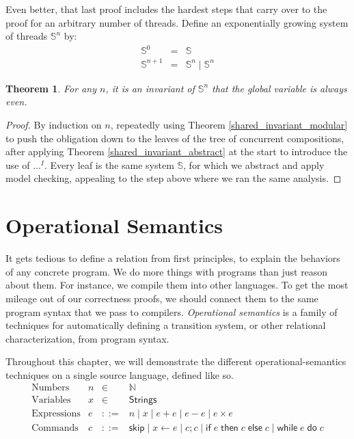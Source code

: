 \documentclass{amsbook}
\newtheorem{theorem}{Theorem}[chapter]
\theoremstyle{definition}
\theoremstyle{remark}
\numberwithin{section}{chapter}
\numberwithin{equation}{chapter}
\begin{document}
Even better, that last proof includes the hardest steps that carry over to the proof for an arbitrary number of threads.
Define an exponentially growing system of threads ${\mathbb S}^n$ by:
\begin{eqnarray*}
  {\mathbb S}^0 &=& \mathbb S \\
  {\mathbb S}^{n+1} &=& {\mathbb S}^n \mid {\mathbb S}^n
\end{eqnarray*}

\begin{theorem}
  For any $n$, it is an invariant of ${\mathbb S}^n$ that the global variable is always even.
\end{theorem}

\begin{proof}
  By induction on $n$, repeatedly using Theorem \ref{shared_invariant_modular} to push the obligation down to the leaves of the tree of concurrent compositions, after applying Theorem \ref{shared_invariant_abstract} at the start to introduce the use of $\ldots^I$.
  Every leaf is the same system $\mathbb S$, for which we abstract and apply model checking, appealing to the step above where we ran the same analysis.
\end{proof}



\chapter{\label{operational_semantics}Operational Semantics}

It gets tedious to define a relation from first principles, to explain the behaviors of any concrete program.
We do more things with programs than just reason about them.
For instance, we compile them into other languages.
To get the most mileage out of our correctness proofs, we should connect them to the same program syntax that we pass to compilers.
\emph{Operational semantics} is a family of techniques for automatically defining a transition system, or other relational characterization, from program syntax.

\newcommand{\assign}[2]{#1 \leftarrow #2}
\newcommand{\skipe}[0]{\mathsf{skip}}
\newcommand{\ifte}[3]{\mathsf{if} \; #1 \; \mathsf{then} \; #2 \; \mathsf{else} \; #3}
\newcommand{\while}[2]{\mathsf{while} \; #1 \; \mathsf{do} \; #2}

Throughout this chapter, we will demonstrate the different operational-semantics techniques on a single source language, defined like so.
$$\begin{array}{rrcl}
  \textrm{Numbers} & n &\in& \mathbb N \\
  \textrm{Variables} & x &\in& \mathsf{Strings} \\
  \textrm{Expressions} & e &::=& n \mid x \mid e + e \mid e - e \mid e \times e \\
  \textrm{Commands} & c &::=& \skipe \mid \assign{x}{e} \mid c; c \mid \ifte{e}{c}{c} \mid \while{e}{c}
\end{array}$$
\end{document}

